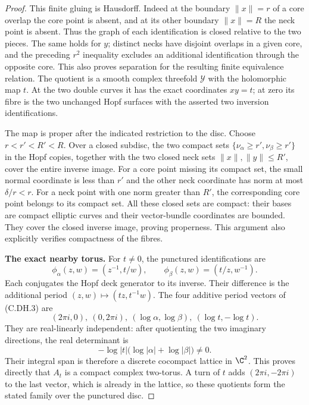\begin{proof}
This finite gluing is Hausdorff.
Indeed at the boundary $\|x\|=r$
of a core overlap the core
point is absent, and at its
other boundary $\|x\|=R$ the
neck point is absent. Thus
the graph of each identification
is closed relative to the
two pieces. The same holds
for $y$; distinct necks have
disjoint overlaps in a given
core, and the preceding
$r^2$ inequality excludes
an additional identification
through the opposite core.
This also proves separation
for the resulting finite
equivalence relation. The
quotient is a smooth complex
threefold $\mathcal Y$ with
the holomorphic map $t$.
At the two double curves it
has the exact coordinates
$xy=t$; at zero its fibre
is the two unchanged Hopf
surfaces with the asserted
two inversion identifications.

The map is proper after the
indicated restriction to the
disc. Choose
$r<r'<R'<R$.
Over a closed subdisc,
the two compact sets
$\{\nu_\alpha\ge r',\nu_\beta\ge r'\}$
in the Hopf copies, together
with the two closed neck sets
$\|x\|,\|y\|\le R'$, cover
the entire inverse image.
For a core point missing its
compact set, the small normal
coordinate is less than $r'$
and the other neck coordinate
has norm at most $\delta/r<r$.
For a neck point with one
norm greater than $R'$,
the corresponding core point
belongs to its compact set.
All these closed sets are
compact: their bases are
compact elliptic curves and
their vector-bundle coordinates
are bounded. They cover the
closed inverse image, proving
properness. This argument
also explicitly verifies
compactness of the fibres.

\par\medskip\noindent\textbf{The exact nearby torus.}
For $t\ne0$, the punctured
identifications are
\[
 \phi_\alpha(z,w)=(z^{-1},t/w),\qquad
 \phi_\beta(z,w)=(t/z,w^{-1}).                       \tag{C.DH.9}
\]
Each conjugates the Hopf deck
generator to its inverse.
Their difference is the
additional period
$(z,w)\mapsto(tz,t^{-1}w)$.
The four additive period
vectors of (C.DH.3) are
\[
 (2\pi i,0),\ (0,2\pi i),\
 (\log\alpha,\log\beta),\
                         (\log t,-\log t).          \tag{C.DH.10}
\]
They are real-linearly
independent: after quotienting
the two imaginary directions,
the real determinant is
\[
       -\log|t|\bigl(\log|\alpha|+\log|\beta|\bigr)
                                      \ne0.          \tag{C.DH.11}
\]
Their integral span is
therefore a discrete
cocompact lattice in $\C^2$.
This proves directly that
$A_t$ is a compact complex
two-torus. A turn of $t$
adds $(2\pi i,-2\pi i)$
to the last vector, which
is already in the lattice,
so these quotients form
the stated family over
the punctured disc.


\end{proof}
